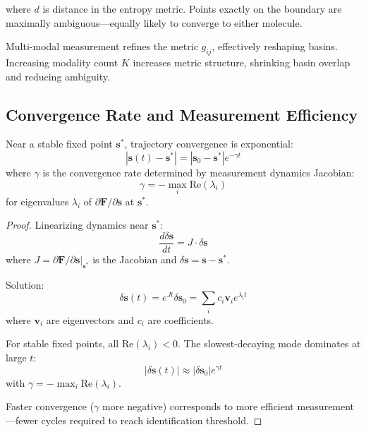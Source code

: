 where $d$ is distance in the entropy metric. Points exactly on the boundary are maximally ambiguous—equally likely to converge to either molecule.

Multi-modal measurement refines the metric $g_{ij}$, effectively reshaping basins. Increasing modality count $K$ increases metric structure, shrinking basin overlap and reducing ambiguity.

\subsection{Convergence Rate and Measurement Efficiency}

\begin{theorem}
\label{thm:exponential_convergence}
Near a stable fixed point $\mathbf{s}^*$, trajectory convergence is exponential:
\begin{equation}
|\mathbf{s}(t) - \mathbf{s}^*| = |\mathbf{s}_0 - \mathbf{s}^*| e^{-\gamma t}
\end{equation}
where $\gamma$ is the convergence rate determined by measurement dynamics Jacobian:
\begin{equation}
\gamma = -\max_i \text{Re}(\lambda_i)
\end{equation}
for eigenvalues $\lambda_i$ of $\partial \mathbf{F}/\partial \mathbf{s}$ at $\mathbf{s}^*$.
\end{theorem}

\begin{proof}
Linearizing dynamics near $\mathbf{s}^*$:
\begin{equation}
\frac{d\delta\mathbf{s}}{dt} = J \cdot \delta\mathbf{s}
\end{equation}
where $J = \partial \mathbf{F}/\partial \mathbf{s}|_{\mathbf{s}^*}$ is the Jacobian and $\delta\mathbf{s} = \mathbf{s} - \mathbf{s}^*$.

Solution:
\begin{equation}
\delta\mathbf{s}(t) = e^{Jt} \delta\mathbf{s}_0 = \sum_i c_i \mathbf{v}_i e^{\lambda_i t}
\end{equation}
where $\mathbf{v}_i$ are eigenvectors and $c_i$ are coefficients.

For stable fixed points, all $\text{Re}(\lambda_i) < 0$. The slowest-decaying mode dominates at large $t$:
\begin{equation}
|\delta\mathbf{s}(t)| \approx |\delta\mathbf{s}_0| e^{\gamma t}
\end{equation}
with $\gamma = -\max_i \text{Re}(\lambda_i)$.

Faster convergence ($\gamma$ more negative) corresponds to more efficient measurement—fewer cycles required to reach identification threshold.
\end{proof}

